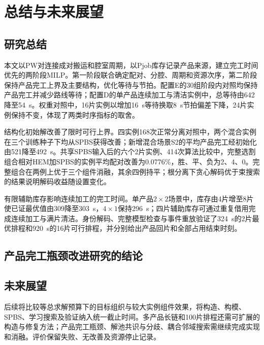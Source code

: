 \chapter{总结与未来展望}
\section{研究总结}
本文以PW对连接成对搬运和腔室周期，以Pjob库存记录产品来源，建立完工时间优先的两阶段MILP。第一阶段联合确定配对、分腔、周期和资源次序，第二阶段保持产品完工上界及主要结构，优化等待与节拍。配置E的30组阶段内对照均保持产品完工并减少路线等待；配置D的单产品连续加工与清洁实例中，总等待由642降至54~s。权重对照中，16片实例以增加16~s等待换取8~s节拍偏差下降，24片实例保持不变，体现了两类时序指标的取舍。

结构化初始解改善了限时可行上界。四实例168次正常分离对照中，两个混合实例在三个训练种子下均从SPBS获得改善；新增混合场景S2的平均产品完工经初始化由521降至492~s。共享SPBS输入后的六个2片实例、414次算法比较中，完整选割组合相对HEM加SPBS的实例平均配对改善为0.0776\%，胜、平、负为2、4、0。完整组合在两例上优于三个组件消融，其余四例持平；根分离下贪心解码优于束搜索的结果说明解码收益随设置变化。

有限辅助库存影响连续加工的完工时间。单产品$2\times2$场景中，库存由4片增至8片使已证最优值由309降至303~s，$4\times1$保持296~s；四片辅助库存可通过重复借用完成连续加工与满片清洁。身份解码、完整模型检查与事件重放验证了324~s的2片最优排程和920~s的16片可行排程，并分别给出产品回片和全部占用结束时刻。

\section{产品完工瓶颈改进研究的结论}
\vspace*{0.8cm}
\section{未来展望}
后续将比较等总求解预算下的目标组织与较大实例组件效果，将构造、构模、SPBS、学习搜索及验证纳入统一截止时间。多产品长链和100片排程还需可扩展的构造与修复方法；产品完工瓶颈、解池共识与分歧、耦合邻域搜索需继续完成实现和消融。评价保留失败、无改善及资源停止记录。

